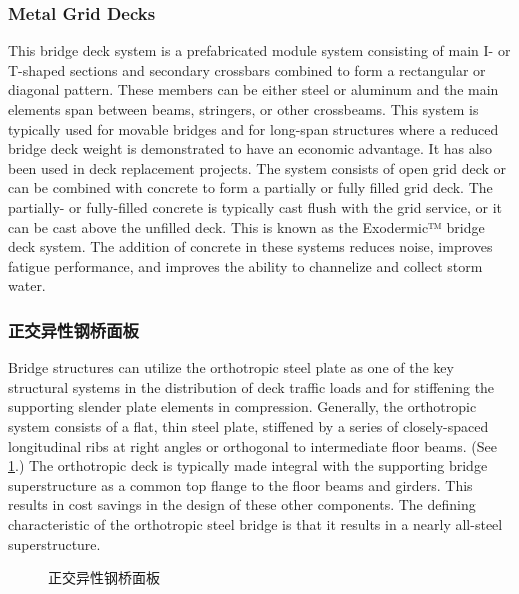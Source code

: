 \subsubsection{Metal Grid Decks}
This bridge deck system is a prefabricated module system consisting of main I- or T-shaped sections and secondary crossbars combined to form a rectangular or diagonal pattern. These members can be either steel or aluminum and the main elements span between beams, stringers, or other crossbeams. This system is typically used for movable bridges and for long-span structures where a reduced bridge deck weight is demonstrated to have an economic advantage. It has also been used in deck replacement projects. The system consists of open grid deck or can be combined with concrete to form a partially or fully filled grid deck. The partially- or fully-filled concrete is typically cast flush with the grid service, or it can be cast above the unfilled deck. This is known as the Exodermic™ bridge deck system. The addition of concrete in these systems reduces noise, improves fatigue performance, and improves the ability to channelize and collect storm water.


\subsubsection{正交异性钢桥面板}
\label{subsubsec:steel-orthotropic-deck}
Bridge structures can utilize the orthotropic steel plate as one of the key structural systems in the distribution of deck traffic loads and for stiffening the supporting slender plate elements in compression. Generally, the orthotropic system consists of a flat, thin steel plate, stiffened by a series of closely-spaced longitudinal ribs at right angles or orthogonal to intermediate floor beams. (See \cref{fig:orthotropic-steel-deck}.) The orthotropic deck is typically made integral with the supporting bridge superstructure as a common top flange to the floor beams and girders. This results in cost savings in the design of these other components. The defining characteristic of the orthotropic steel bridge is that it results in a nearly all-steel superstructure.

\begin{figure}
  \caption{正交异性钢桥面板}
  \label{fig:orthotropic-steel-deck}
\end{figure}

